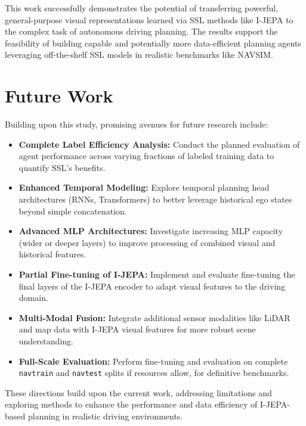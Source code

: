 \documentclass{article}
\begin{document}
This work successfully demonstrates the potential of transferring powerful, general-purpose visual representations learned via SSL methods like I-JEPA to the complex task of autonomous driving planning. The results support the feasibility of building capable and potentially more data-efficient planning agents leveraging off-the-shelf SSL models in realistic benchmarks like NAVSIM.

\section{Future Work}
\label{sec:futurework}

Building upon this study, promising avenues for future research include:

\begin{itemize}
    \item \textbf{Complete Label Efficiency Analysis:} Conduct the planned evaluation of agent performance across varying fractions of labeled training data to quantify SSL's benefits.
    \item \textbf{Enhanced Temporal Modeling:} Explore temporal planning head architectures (RNNs, Transformers) to better leverage historical ego states beyond simple concatenation.
    \item \textbf{Advanced MLP Architectures:} Investigate increasing MLP capacity (wider or deeper layers) to improve processing of combined visual and historical features.
    \item \textbf{Partial Fine-tuning of I-JEPA:} Implement and evaluate fine-tuning the final layers of the I-JEPA encoder to adapt visual features to the driving domain.
    \item \textbf{Multi-Modal Fusion:} Integrate additional sensor modalities like LiDAR and map data with I-JEPA visual features for more robust scene understanding.
    \item \textbf{Full-Scale Evaluation:} Perform fine-tuning and evaluation on complete \texttt{navtrain} and \texttt{navtest} splits if resources allow, for definitive benchmarks.

\end{itemize}

These directions build upon the current work, addressing limitations and exploring methods to enhance the performance and data efficiency of I-JEPA-based planning in realistic driving environments.






\end{document}
